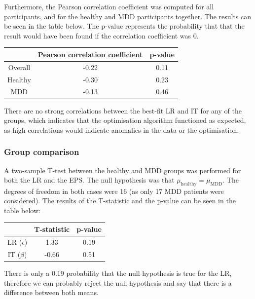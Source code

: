 \documentclass[12pt]{article}
\begin{document}
Furthermore, the Pearson correlation coefficient was computed for all participants, and for the healthy and MDD participants together. The results can be seen in the table below. The p-value represents the probability that that the result would have been found if the correlation coefficient was 0.

\begin{center}
 \begin{tabular}{|c || c | c |} 
 \hline
  & Pearson correlation coefficient & p-value  \\ [0.5ex] 
 \hline\hline
 Overall & -0.22 & 0.11 \\ 
 \hline
 Healthy & -0.30 & 0.23 \\
 \hline
 MDD & -0.13 & 0.46 \\ [1ex] 
 \hline
\end{tabular}
\end{center}

There are no strong correlations between the best-fit LR and IT for any of the groups, which indicates that the optimisation algorithm functioned as expected, as high correlations would indicate anomalies in the data or the optimisation. 

\subsubsection{Group comparison}
\label{sec:t-model-0}
A two-sample T-test between the healthy and MDD groups was performed for both the LR and the EPS. The null hypothesis was that $\mu_{\mathrm{healthy}} = \mu_{\mathrm{MDD}}$. The degrees of freedom in both cases were 16 (as only 17 MDD patients were considered). The results of the T-statistic and the p-value can be seen in the table below:

\begin{center}
 \begin{tabular}{|c || c | c |} 
 \hline
  & T-statistic & p-value  \\ [0.5ex] 
 \hline\hline
 LR ($\epsilon$) & 1.33 & 0.19 \\
 \hline
 IT ($\beta$) & -0.66 & 0.51 \\ [1ex] 
 \hline
\end{tabular}
\end{center}

There is only a 0.19 probability that the null hypothesis is true for the LR, therefore we can probably reject the null hypothesis and say that there is a difference between both means.
\end{document}
